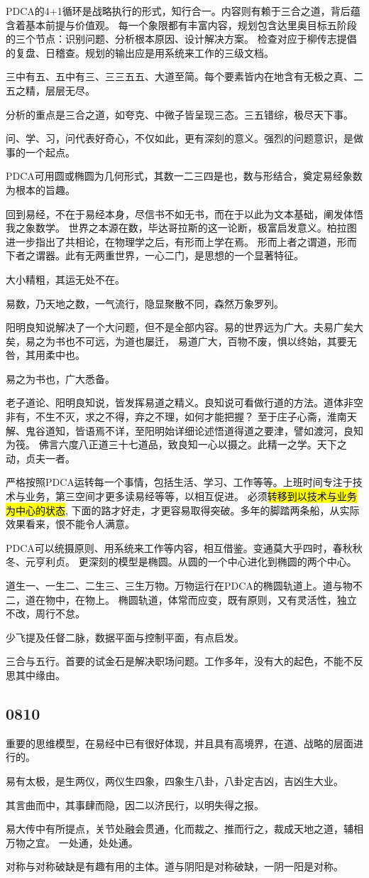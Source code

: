 PDCA的4+1循环是战略执行的形式，知行合一。内容则有赖于三合之道，背后蕴含着基本前提与价值观。
每一个象限都有丰富内容，规划包含达里奥目标五阶段的三个节点：识别问题、分析根本原因、设计解决方案。
检查对应于柳传志提倡的复盘、日稽查。规划的输出应是用系统来工作的三级文档。

三中有五、五中有三、三三五五、大道至简。每个要素皆内在地含有无极之真、二五之精，层层无尽。

分析的重点是三合之道，如夸克、中微子皆呈现三态。三五错综，极尽天下事。

问、学、习，问代表好奇心，不仅如此，更有深刻的意义。强烈的问题意识，是做事的一个起点。

PDCA可用圆或椭圆为几何形式，其数一二三四是也，数与形结合，奠定易经象数为根本的旨趣。

回到易经，不在于易经本身，尽信书不如无书，而在于以此为文本基础，阐发体悟我之象数学。
世界之本源在数，毕达哥拉斯的这一论断，极富启发意义。柏拉图进一步指出了共相论，在物理学之后，有形而上学在焉。
形而上者之谓道，形而下者之谓器。此有无两重世界，一心二门，是思想的一个显著特征。

大小精粗，其运无处不在。

易数，乃天地之数，一气流行，隐显聚散不同，森然万象罗列。

阳明良知说解决了一个大问题，但不是全部内容。易的世界远为广大。夫易广矣大矣，易之为书也不可远，为道也屡迁，
易道广大，百物不废，惧以终始，其要无咎，其用柔中也。

易之为书也，广大悉备。

老子道论、阳明良知说，皆发挥易道之精义。良知说可看做行道的方法。道体非空非有，不生不灭，求之不得，弃之不理，如何才能把握？
至于庄子心斋，淮南天解、鬼谷道知，皆语焉不详，至阳明始详细论述悟道得道之要津，譬如渡河，良知为筏。
佛言六度八正道三十七道品，致良知一心以摄之。此精一之学。天下之动，贞夫一者。

严格按照PDCA运转每一个事情，包括生活、学习、工作等等。上班时间专注于技术与业务，第三空间才更多读易经等等，以相互促进。
必须\hl{转移到以技术与业务为中心的状态}, 下面的路才好走，才更容易取得突破。多年的脚踏两条船，从实际效果看来，恨不能令人满意。

PDCA可以统摄原则、用系统来工作等内容，相互借鉴。变通莫大乎四时，春秋秋冬、元亨利贞。
更深刻的模型是椭圆。从圆的一个中心进化到椭圆的两个中心。

道生一、一生二、二生三、三生万物。万物运行在PDCA的椭圆轨道上。道与物不二，道在物中，在物上。
椭圆轨道，体常而应变，既有原则，又有灵活性，独立不改，周行不怠。

少飞提及任督二脉，数据平面与控制平面，有点启发。

三合与五行。首要的试金石是解决职场问题。工作多年，没有大的起色，不能不反思其中缘由。

\subsection{0810}

重要的思维模型，在易经中已有很好体现，并且具有高境界，在道、战略的层面进行的。

易有太极，是生两仪，两仪生四象，四象生八卦，八卦定吉凶，吉凶生大业。

其言曲而中，其事肆而隐，因二以济民行，以明失得之报。

易大传中有所提点，关节处融会贯通，化而裁之、推而行之，裁成天地之道，辅相万物之宜。
一处通，处处通。

对称与对称破缺是有趣有用的主体。道与阴阳是对称破缺，一阴一阳是对称。
